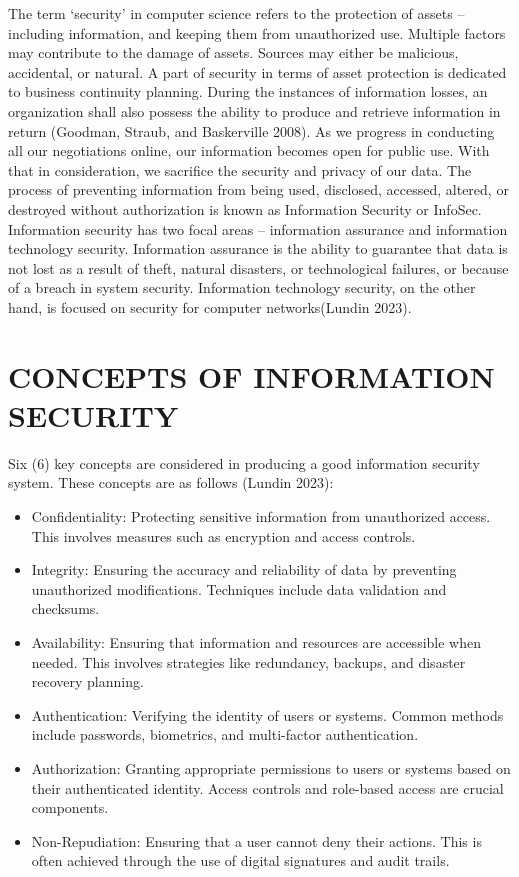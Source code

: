 \documentclass[
  letterpaper,
  DIV=11,
  numbers=noendperiod]{scrreprt}
\providecommand{\tightlist}{%
  \setlength{\itemsep}{0pt}\setlength{\parskip}{0pt}}\usepackage{longtable,booktabs,array}
\begin{document}
The term `security' in computer science refers to the protection of
assets -- including information, and keeping them from unauthorized use.
Multiple factors may contribute to the damage of assets. Sources may
either be malicious, accidental, or natural. A part of security in terms
of asset protection is dedicated to business continuity planning. During
the instances of information losses, an organization shall also possess
the ability to produce and retrieve information in return (Goodman,
Straub, and Baskerville 2008). As we progress in conducting all our
negotiations online, our information becomes open for public use. With
that in consideration, we sacrifice the security and privacy of our
data. The process of preventing information from being used, disclosed,
accessed, altered, or destroyed without authorization is known as
Information Security or InfoSec. Information security has two focal
areas -- information assurance and information technology security.
Information assurance is the ability to guarantee that data is not lost
as a result of theft, natural disasters, or technological failures, or
because of a breach in system security. Information technology security,
on the other hand, is focused on security for computer networks(Lundin
2023).

\section{CONCEPTS OF INFORMATION
SECURITY}\label{concepts-of-information-security}

Six (6) key concepts are considered in producing a good information
security system. These concepts are as follows (Lundin 2023):

\begin{itemize}
\tightlist
\item
  Confidentiality: Protecting sensitive information from unauthorized
  access. This involves measures such as encryption and access controls.
\item
  Integrity: Ensuring the accuracy and reliability of data by preventing
  unauthorized modifications. Techniques include data validation and
  checksums.
\item
  Availability: Ensuring that information and resources are accessible
  when needed. This involves strategies like redundancy, backups, and
  disaster recovery planning.
\item
  Authentication: Verifying the identity of users or systems. Common
  methods include passwords, biometrics, and multi-factor
  authentication.
\item
  Authorization: Granting appropriate permissions to users or systems
  based on their authenticated identity. Access controls and role-based
  access are crucial components.
\item
  Non-Repudiation: Ensuring that a user cannot deny their actions. This
  is often achieved through the use of digital signatures and audit
  trails.
\end{itemize}
\end{document}
